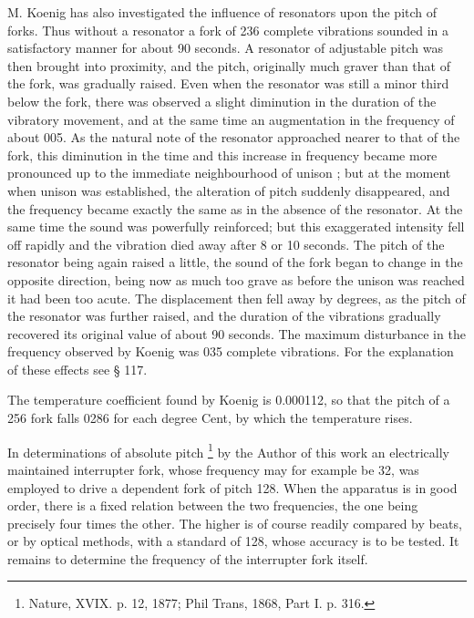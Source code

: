 M. Koenig has also investigated the influence of resonators upon the
pitch of forks. Thus without a resonator a fork of 236 complete
vibrations sounded in a satisfactory manner for about 90 seconds. A
resonator of adjustable pitch was then brought into proximity, and the
pitch, originally much graver than that of the fork, was gradually
raised. Even when the resonator was still a minor third below the fork,
there was observed a slight diminution in the duration of the vibratory
movement, and at the same time an augmentation in the frequency of about
005. As the natural note of the resonator approached nearer to that of
the fork, this diminution in the time and this increase in frequency
became more pronounced up to the immediate neighbourhood of unison ; but
at the moment when unison was established, the alteration of pitch
suddenly disappeared, and the frequency became exactly the same as in
the absence of the resonator. At the same time the sound was powerfully
reinforced; but this exaggerated intensity fell off rapidly and the
vibration died away after 8 or 10 seconds. The pitch of the resonator
being again raised a little, the sound of the fork began to change in
the opposite direction, being now as much too grave as before the unison
was reached it had been too acute. The displacement then fell away by
degrees, as the pitch of the resonator was further raised, and the
duration of the vibrations gradually recovered its original value of
about 90 seconds. The maximum disturbance in the frequency observed by
Koenig was 035 complete vibrations. For the explanation of these effects
see § 117.

The temperature coefficient found by Koenig is 0.000112, so that the pitch
of a 256 fork falls 0286 for each degree Cent, by which the temperature rises.

In determinations of absolute pitch
\footnote{Nature, XVIX. p. 12, 1877; Phil Trans, 1868, Part I. p. 316.}
by the Author of this work an
electrically maintained interrupter fork, whose frequency may for
example be 32, was employed to drive a dependent fork of pitch 128. When
the apparatus is in good order, there is a fixed relation between the
two frequencies, the one being precisely four times the other. The
higher is of course readily compared by beats, or by optical methods,
with a standard of 128, whose accuracy is to be tested. It remains to
determine the frequency of the interrupter fork itself.

